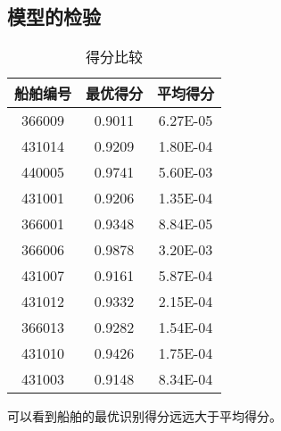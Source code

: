 \subsection{模型的检验}
\begin{table}[htbp]
	\centering
	\caption{得分比较}
	\begin{tabular}{ccc}
		\toprule
		船舶编号	&	最优得分		&	平均得分	\\
		\midrule
		366009 & 0.9011 & 6.27E-05 \\
		431014 & 0.9209 & 1.80E-04 \\
		440005 & 0.9741 & 5.60E-03 \\
		431001 & 0.9206 & 1.35E-04 \\
		366001 & 0.9348 & 8.84E-05 \\
		366006 & 0.9878 & 3.20E-03 \\
		431007 & 0.9161 & 5.87E-04 \\
		431012 & 0.9332 & 2.15E-04 \\
		366013 & 0.9282 & 1.54E-04 \\
		431010 & 0.9426 & 1.75E-04 \\
		431003 & 0.9148 & 8.34E-04	\\
		\bottomrule
	\end{tabular}
\end{table}
\par 可以看到船舶的最优识别得分远远大于平均得分。
